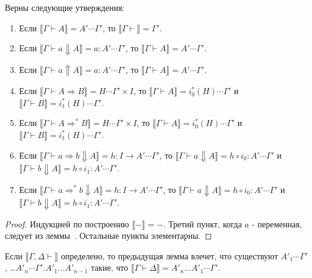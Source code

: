 \documentclass{amsart}
\theoremstyle{definition}
\theoremstyle{remark}
\newcommand{\red}{\Rightarrow}
\renewcommand{\ll}{\llbracket}
\newcommand{\rr}{\rrbracket}
\numberwithin{figure}{section}
\begin{document}
\begin{lem}
Верны следующие утверждения:
\begin{enumerate}
\item Если $\ll \Gamma \vdash A \rr = A' \dotsb \Gamma'$, то $\ll \Gamma \vdash \rr = \Gamma'$.
\item Если $\ll \Gamma \vdash a \Downarrow A \rr = a : A' \dotsb \Gamma'$, то $\ll \Gamma \vdash A \rr = A' \dotsb \Gamma'$.
\item Если $\ll \Gamma \vdash a \Uparrow A \rr = a : A' \dotsb \Gamma'$, то $\ll \Gamma \vdash A \rr = A' \dotsb \Gamma'$.
\item Если $\ll \Gamma \vdash A \red B \rr = H \dotsb \Gamma' \times I$, то $\ll \Gamma \vdash A \rr = i_0^*(H) \dotsb \Gamma'$ и $\ll \Gamma \vdash B \rr = i_1^*(H) \dotsb \Gamma'$.
\item Если $\ll \Gamma \vdash A \red^* B \rr = H \dotsb \Gamma' \times I$, то $\ll \Gamma \vdash A \rr = i_0^*(H) \dotsb \Gamma'$ и $\ll \Gamma \vdash B \rr = i_1^*(H) \dotsb \Gamma'$.
\item Если $\ll \Gamma \vdash a \red b \Downarrow A \rr = h : I \to A' \dotsb \Gamma'$, то $\ll \Gamma \vdash a \Downarrow A \rr = h \circ i_0 : A' \dotsb \Gamma'$ и $\ll \Gamma \vdash b \Downarrow A \rr = h \circ i_1 : A' \dotsb \Gamma'$.
\item Если $\ll \Gamma \vdash a \red^* b \Downarrow A \rr = h : I \to A' \dotsb \Gamma'$, то $\ll \Gamma \vdash a \Downarrow A \rr = h \circ i_0 : A' \dotsb \Gamma'$ и $\ll \Gamma \vdash b \Downarrow A \rr = h \circ i_1 : A' \dotsb \Gamma'$.
\end{enumerate}
\end{lem}
\begin{proof}
Индукцией по построению $\ll - \rr = -$.
Третий пункт, когда $a$ - переменная, следует из леммы~.
Остальные пункты элементарны.
\end{proof}

Если $\ll \Gamma, \Delta \vdash \rr$ определено, то предыдущая лемма влечет, что существуют $A'_1 \dotsb \Gamma'$, \ldots $A'_n \dotsb \Gamma'.A'_1 \ldots A'_{n-1}$ такие, что $\ll \Gamma \vdash \Delta \rr = A'_n \ldots A'_1 \dotsb \Gamma'$.
\end{document}
